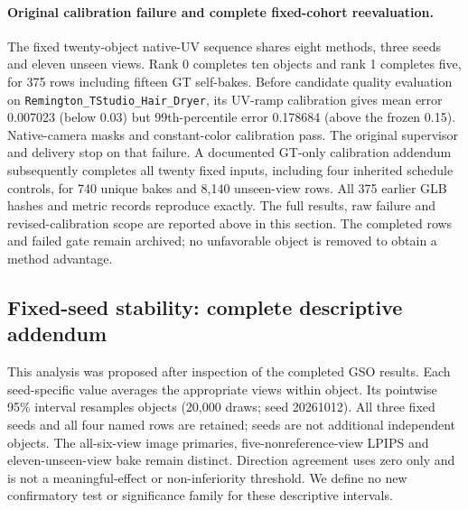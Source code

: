 \documentclass[11pt]{article}
\begin{document}
\paragraph{Original calibration failure and complete fixed-cohort reevaluation.}
The fixed twenty-object native-UV sequence shares eight methods, three seeds and eleven unseen views. Rank 0 completes ten objects and rank 1 completes five, for 375 rows including fifteen GT self-bakes. Before candidate quality evaluation on \texttt{Remington\_\allowbreak TStudio\_\allowbreak Hair\_\allowbreak Dryer}, its UV-ramp calibration gives mean error 0.007023 (below 0.03) but 99th-percentile error 0.178684 (above the frozen 0.15). Native-camera masks and constant-color calibration pass. The original supervisor and delivery stop on that failure. A documented GT-only calibration addendum subsequently completes all twenty fixed inputs, including four inherited schedule controls, for 740 unique bakes and 8,140 unseen-view rows. All 375 earlier GLB hashes and metric records reproduce exactly. The full results, raw failure and revised-calibration scope are reported above in this section. The completed rows and failed gate remain archived; no unfavorable object is removed to obtain a method advantage.

\FloatBarrier
\subsection*{Fixed-seed stability: complete descriptive addendum}
This analysis was proposed after inspection of the completed GSO results. Each seed-specific value averages the appropriate views within object. Its pointwise 95\% interval resamples objects (20,000 draws; seed 20261012). All three fixed seeds and all four named rows are retained; seeds are not additional independent objects. The all-six-view image primaries, five-nonreference-view LPIPS and eleven-unseen-view bake remain distinct. Direction agreement uses zero only and is not a meaningful-effect or non-inferiority threshold. We define no new confirmatory test or significance family for these descriptive intervals.
\end{document}
